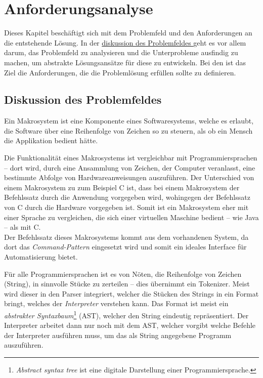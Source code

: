 \section{An\-for\-de\-rungs\-ana\-ly\-se}
\label{sec:Anforderungsanalyse}
  Dieses Kapitel beschäftigt sich mit dem Problemfeld und den Anforderungen an die entstehende Lösung. In der \hyperref[ssec:Diskussion des Problemfeldes]{
    diskussion des Problemfeldes
  } geht es vor allem darum, das Problemfeld zu analysieren und die Unterprobleme ausfindig zu machen, um abstrakte Lösungsansätze für diese zu entwickeln. Bei den  ist das Ziel die Anforderungen, die die Problemlösung erfüllen sollte zu definieren.

  \subsection{Diskussion des Problemfeldes}
  \label{ssec:Diskussion des Problemfeldes}
    Ein Makrosystem ist eine Komponente eines Softwaresystems, welche es erlaubt, die Software über eine Reihenfolge von Zeichen so zu steuern, als ob ein Mensch die Applikation bedient hätte.

    Die Funktionalität eines Makrosystems ist vergleichbar mit Programmiersprachen -- dort wird, durch eine Ansammlung von Zeichen, der Computer veranlasst, eine bestimmte Abfolge von Hardwareanweisungen auszuführen. Der Unterschied von einem Makrosystem zu zum Beispiel C ist, dass bei einem Makrosystem der Befehlssatz durch die Anwendung vorgegeben wird, wohingegen der Befehlssatz von C durch die Hardware vorgegeben ist. Somit ist ein Makrosystem eher mit einer Sprache zu vergleichen, die sich einer virtuellen Maschine bedient -- wie Java -- als mit C.\\
    Der Befehlssatz dieses Makrosystems kommt aus dem vorhandenen System, da dort das \emph{Command-Pattern}\autocite[S.263]{Gamma:1995:DPE:186897} eingesetzt wird und somit ein ideales Interface für Automatisierung bietet.

    Für alle Programmiersprachen ist es von Nöten, die Reihenfolge von Zeichen (String), in sinnvolle Stücke zu zerteilen -- dies übernimmt ein Tokenizer. Meist wird dieser in den Parser\autocite[S.46]{eirund2013formale}
    integriert, welcher die Stücken des Strings in ein Format bringt, welches der \emph{Interpreter}\autocite[S.274]{Gamma:1995:DPE:186897} verstehen kann. Das Format ist meist ein \emph{abstrakter Syntaxbaum}\footnote{%
      \textit{Abstract syntax tree} ist eine digitale Darstellung einer Programmiersprache.
    } (AST), welcher den String eindeutig repräsentiert. Der Interpreter arbeitet dann nur noch mit dem AST, welcher vorgibt welche Befehle der Interpreter ausführen muss, um das als String angegebene Programm auszuführen.

